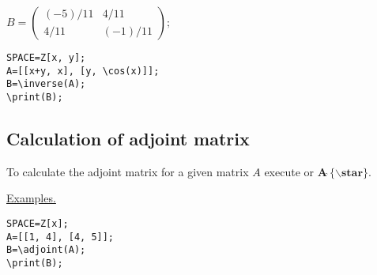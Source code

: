 {$B =\left(\begin{array}{cc}(-5)/11 &4/11\\ 4/11 & (-1)/11 \end{array}\right);$}

\begin{verbatim}
SPACE=Z[x, y]; 
A=[[x+y, x], [y, \cos(x)]];
B=\inverse(A); 
\print(B);
\end{verbatim}


\subsection{Calculation of adjoint matrix} 
To calculate the adjoint matrix for a given matrix $A$  execute 
 or
  $\mathbf{A\widehat{\ }\{\backslash star\}}$. 

\underline{Examples. }

\vspace*{-2mm}
\begin{verbatim}
SPACE=Z[x]; 
A=[[1, 4], [4, 5]];
B=\adjoint(A);  
\print(B);
\end{verbatim}

